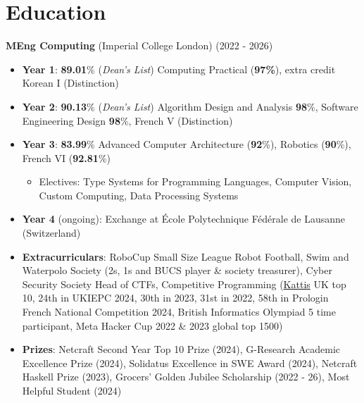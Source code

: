 \documentclass{Resume}
\begin{document}

\vspace{-2em}
\section{Education}
\textbf{MEng Computing} (Imperial College London) \hfill (2022 - 2026)

 {\small
 \begin{itemize}[label=--]
      \item \textbf{Year 1}: \textbf{89.01}\% (\textit{Dean's List}) Computing Practical (\textbf{97\%}), extra credit Korean I (Distinction)
     \item \textbf{Year 2}: \textbf{90.13}\% (\textit{Dean's List}) Algorithm Design and Analysis \textbf{98}\%, Software Engineering Design \textbf{98}\%, French V (Distinction)
    \item \textbf{Year 3}: \textbf{83.99}\% Advanced Computer Architecture (\textbf{92}\%), Robotics (\textbf{90}\%), French VI (\textbf{92.81}\%) \begin{itemize}
        \item Electives: Type Systems for Programming Languages, Computer Vision, Custom Computing, Data Processing Systems
    \end{itemize}
     \item \textbf{Year 4} (ongoing): Exchange at École Polytechnique Fédérale de Lausanne (Switzerland)
    \item \textbf{Extracurriculars}: RoboCup Small Size League Robot Football, Swim and Waterpolo Society (2s, 1s and BUCS player \& society treasurer), Cyber Security Society Head of CTFs, Competitive Programming (\href{https://open.kattis.com/countries/GBR}{Kattis} UK top 10, 24th in UKIEPC 2024, 30th in 2023, 31st in 2022, 58th in Prologin French National Competition 2024, British Informatics Olympiad 5 time participant, Meta Hacker Cup 2022 \& 2023 global top 1500)
    \item \textbf{Prizes}: Netcraft Second Year Top 10 Prize (2024), G-Research Academic Excellence Prize (2024), Solidatus Excellence in SWE Award (2024), Netcraft Haskell Prize (2023), Grocers' Golden Jubilee Scholarship (2022 - 26), Most Helpful Student (2024)
    

\end{itemize}}
\end{document}
